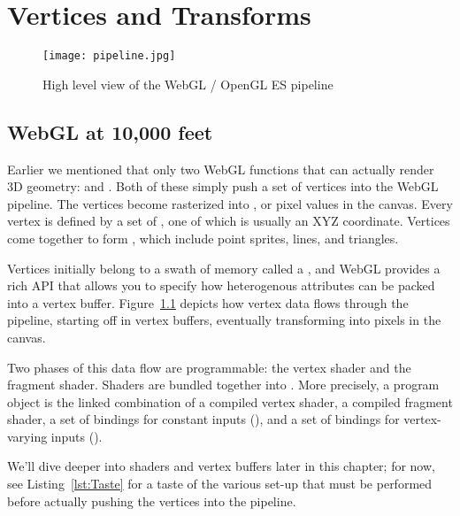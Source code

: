 \chapter{Vertices and Transforms}%
\label{ch2}

\begin{figure}[htb]\centering
  \texttt{[image: pipeline.jpg]}
  \caption{High level view of the WebGL / OpenGL ES pipeline}
  \label{fig:AssemblyLine}
\end{figure}

\section{WebGL at 10,000 feet}

Earlier we mentioned that only two WebGL functions that can actually render 3D geometry:  and .  Both of these simply push a set of  vertices into the WebGL pipeline.  The vertices become rasterized into  , or pixel values in the canvas.  Every vertex is defined by a set of , one of which is usually an XYZ coordinate.  Vertices come together to form , which include point sprites, lines, and triangles.

Vertices initially belong to a swath of memory called a , and WebGL provides a rich API that allows you to specify how heterogenous attributes can be packed into a vertex buffer.  Figure~\ref{fig:AssemblyLine} depicts how vertex data flows through the pipeline, starting off in vertex buffers, eventually transforming into pixels in the canvas.

Two phases of this data flow are programmable: the vertex shader and the fragment shader.  Shaders are bundled together into  .   More precisely, a program object is the linked combination of a compiled vertex shader, a compiled fragment shader, a set of bindings for constant inputs (), and a set of bindings for vertex-varying inputs ().

We'll dive deeper into shaders and vertex buffers later in this chapter; for now, see Listing~\ref{lst:Taste} for a taste of the various set-up that must be performed before actually pushing the vertices into the pipeline.

